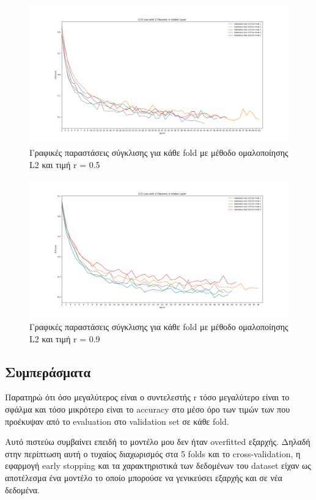 \documentclass[12pt,a4paper]{article}
\begin{document}
\begin{figure}[H]
	\includegraphics[width=\textwidth]{Screenshots/29. L2 with r = 0.5.png}
	\caption{Γραφικές παραστάσεις σύγκλισης για κάθε fold με μέθοδο ομαλοποίησης L2 και τιμή r = 0.5}
\end{figure}

\begin{figure}[H]
	\includegraphics[width=\textwidth]{Screenshots/30. L2 with r = 0.9.png}
	\caption{Γραφικές παραστάσεις σύγκλισης για κάθε fold με μέθοδο ομαλοποίησης L2 και τιμή r = 0.9}
\end{figure}

\subsection{Συμπεράσματα}

Παρατηρώ ότι όσο μεγαλύτερος είναι ο συντελεστής r τόσο μεγαλύτερο είναι το σφάλμα και τόσο μικρότερο είναι το accuracy στο μέσο όρο των τιμών των που προέκυψαν από το evaluation στο validation set σε κάθε fold. 

Αυτό πιστεύω συμβαίνει επειδή το μοντέλο μου δεν ήταν overfitted εξαρχής. Δηλαδή στην περίπτωση αυτή ο τυχαίος διαχωρισμός στα 5 folds και το cross-validation, η εφαρμογή early stopping και τα χαρακτηριστικά των δεδομένων του dataset είχαν ως αποτέλεσμα ένα μοντέλο το οποίο μπορούσε να γενικεύσει εξαρχής και σε νέα δεδομένα.
\end{document}
